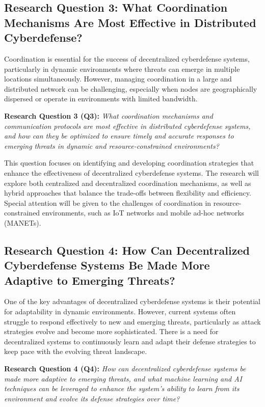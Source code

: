 \subsection{Research Question 3: What Coordination Mechanisms Are Most Effective in Distributed Cyberdefense?}

Coordination is essential for the success of decentralized cyberdefense systems, particularly in dynamic environments where threats can emerge in multiple locations simultaneously. However, managing coordination in a large and distributed network can be challenging, especially when nodes are geographically dispersed or operate in environments with limited bandwidth.

\textbf{Research Question 3 (Q3):} \textit{What coordination mechanisms and communication protocols are most effective in distributed cyberdefense systems, and how can they be optimized to ensure timely and accurate responses to emerging threats in dynamic and resource-constrained environments?}

This question focuses on identifying and developing coordination strategies that enhance the effectiveness of decentralized cyberdefense systems. The research will explore both centralized and decentralized coordination mechanisms, as well as hybrid approaches that balance the trade-offs between flexibility and efficiency. Special attention will be given to the challenges of coordination in resource-constrained environments, such as IoT networks and mobile ad-hoc networks (MANETs).

\subsection{Research Question 4: How Can Decentralized Cyberdefense Systems Be Made More Adaptive to Emerging Threats?}

One of the key advantages of decentralized cyberdefense systems is their potential for adaptability in dynamic environments. However, current systems often struggle to respond effectively to new and emerging threats, particularly as attack strategies evolve and become more sophisticated. There is a need for decentralized systems to continuously learn and adapt their defense strategies to keep pace with the evolving threat landscape.

\textbf{Research Question 4 (Q4):} \textit{How can decentralized cyberdefense systems be made more adaptive to emerging threats, and what machine learning and AI techniques can be leveraged to enhance the system's ability to learn from its environment and evolve its defense strategies over time?}

